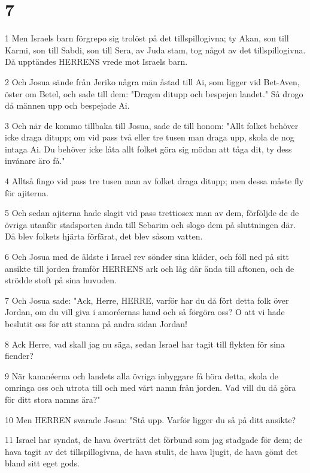 \chapter{7}

\par 1 Men Israels barn förgrepo sig trolöst på det tillspillogivna; ty Akan, son till Karmi, son till Sabdi, son till Sera, av Juda stam, tog något av det tillspillogivna. Då upptändes HERRENS vrede mot Israels barn.
\par 2 Och Josua sände från Jeriko några män åstad till Ai, som ligger vid Bet-Aven, öster om Betel, och sade till dem: "Dragen ditupp och bespejen landet." Så drogo då männen upp och bespejade Ai.
\par 3 Och när de kommo tillbaka till Josua, sade de till honom: "Allt folket behöver icke draga ditupp; om vid pass två eller tre tusen man draga upp, skola de nog intaga Ai. Du behöver icke låta allt folket göra sig mödan att tåga dit, ty dess invånare äro få."
\par 4 Alltså fingo vid pass tre tusen man av folket draga ditupp; men dessa måste fly för ajiterna.
\par 5 Och sedan ajiterna hade slagit vid pass trettiosex man av dem, förföljde de de övriga utanför stadsporten ända till Sebarim och slogo dem på sluttningen där. Då blev folkets hjärta förfärat, det blev såsom vatten.
\par 6 Och Josua med de äldste i Israel rev sönder sina kläder, och föll ned på sitt ansikte till jorden framför HERRENS ark och låg där ända till aftonen, och de strödde stoft på sina huvuden.
\par 7 Och Josua sade: "Ack, Herre, HERRE, varför har du då fört detta folk över Jordan, om du vill giva i amoréernas hand och så förgöra oss? O att vi hade beslutit oss för att stanna på andra sidan Jordan!
\par 8 Ack Herre, vad skall jag nu säga, sedan Israel har tagit till flykten för sina fiender?
\par 9 När kananéerna och landets alla övriga inbyggare få höra detta, skola de omringa oss och utrota till och med vårt namn från jorden. Vad vill du då göra för ditt stora namns ära?"
\par 10 Men HERREN svarade Josua: "Stå upp. Varför ligger du så på ditt ansikte?
\par 11 Israel har syndat, de hava överträtt det förbund som jag stadgade för dem; de hava tagit av det tillspillogivna, de hava stulit, de hava ljugit, de hava gömt det bland sitt eget gods.
